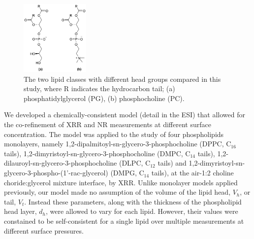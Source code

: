 \documentclass[%
 reprint,
 amsmath,amssymb,
 prl,
]{revtex4-1}
\begin{document}
%
\begin{figure}[b]
\includegraphics[width=0.3\textwidth]{figures/head_groups}
\caption{\label{fig:heads} The two lipid classes with different head groups compared in this study, where R indicates the hydrocarbon tail; (a) phosphatidylglycerol (PG), (b) phosphocholine (PC).}
\end{figure}
%
We developed a chemically-consistent model (detail in the ESI) that allowed for the co-refinement of XRR and NR measurements at different surface concentration.
The model was applied to the study of four phospholipids monolayers, namely 1,2-dipalmitoyl-sn-glycero-3-phosphocholine (DPPC, C$_{16}$ tails), 1,2-dimyristoyl-sn-glycero-3-phosphocholine (DMPC, C$_{14}$ tails),  1,2-dilauroyl-sn-glycero-3-phosphocholine (DLPC, C$_{12}$ tails) and 1,2-dimyristoyl-sn-glycero-3-phospho-(1'-rac-glycerol) (DMPG, C$_{14}$ tails), at the air-1:2 choline choride:glycerol mixture interface, by XRR.
Unlike monolayer models applied previously\cite{Mohwald1990,Kewalramani2010,Bayerl1990,Johnson1991,Clifton2012,Helm1987,Daillant1990}, our model made no assumption of the volume of the lipid head, $V_h$, or tail, $V_t$.
Instead these parameters, along with the thickness of the phospholipid head layer, $d_h$, were allowed to vary for each lipid.
However, their values were constained to be self-consistent for a single lipid over multiple measurements at different surface pressures.
\end{document}
